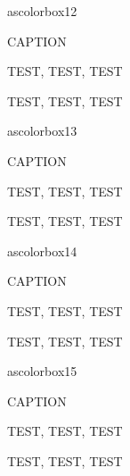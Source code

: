 ascolorbox12

\begin{ascolorbox12}{CAPTION}

TEST, TEST, TEST

\end{ascolorbox12}

\begin{ascolorbox12}{}

TEST, TEST, TEST

\end{ascolorbox12}

ascolorbox13

\begin{ascolorbox13}{CAPTION}

TEST, TEST, TEST

\end{ascolorbox13}

\begin{ascolorbox13}{}

TEST, TEST, TEST

\end{ascolorbox13}

ascolorbox14

\begin{ascolorbox14}{CAPTION}

TEST, TEST, TEST

\end{ascolorbox14}

\begin{ascolorbox14}{}

TEST, TEST, TEST

\end{ascolorbox14}

ascolorbox15

\begin{ascolorbox15}{CAPTION}

TEST, TEST, TEST

\end{ascolorbox15}

\begin{ascolorbox15}{}

TEST, TEST, TEST

\end{ascolorbox15}

